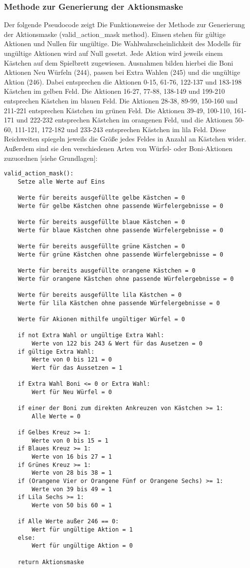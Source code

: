 \subsubsection{Methode zur Generierung der Aktionsmaske}
Der folgende Pseudocode zeigt Die Funktionsweise der Methode zur Generierung der Aktionsmaske (valid\_action\_mask method). Einsen stehen für gültige Aktionen und Nullen für ungültige. Die Wahlwahrscheinlichkeit des Modells für ungültige Aktionen wird auf Null gesetzt. Jede Aktion wird jeweils einem Kästchen auf dem Spielbrett zugewiesen. Ausnahmen bilden hierbei die Boni Aktionen Neu Würfeln (244), passen bei Extra Wahlen (245) und die ungültige Aktion (246). Dabei entsprechen die Aktionen 0-15, 61-76, 122-137 und 183-198 Kästchen im gelben Feld. Die Aktionen 16-27, 77-88, 138-149 und 199-210 entsprechen Kästchen im blauen Feld. Die Aktionen 28-38, 89-99, 150-160 und 211-221 entsprechen Kästchen im grünen Feld. Die Aktionen 39-49, 100-110, 161-171 und 222-232 entsprechen Kästchen im orangenen Feld, und die Aktionen 50-60, 111-121, 172-182 und 233-243 entsprechen Kästchen im lila Feld. Diese Reichweiten spiegeln jeweils die Größe jedes Feldes in Anzahl an Kästchen wider. Außerdem sind sie den verschiedenen Arten von Würfel- oder Boni-Aktionen zuzuordnen [siehe Grundlagen]:
\vspace{0.5cm}
\begin{lstlisting}
valid_action_mask():
	Setze alle Werte auf Eins
	
	Werte für bereits ausgefüllte gelbe Kästchen = 0
	Werte für gelbe Kästchen ohne passende Würfelergebnisse = 0
	
	Werte für bereits ausgefüllte blaue Kästchen = 0
	Werte für blaue Kästchen ohne passende Würfelergebnisse = 0
	
	Werte für bereits ausgefüllte grüne Kästchen = 0
	Werte für grüne Kästchen ohne passende Würfelergebnisse = 0
	
	Werte für bereits ausgefüllte orangene Kästchen = 0
	Werte für orangene Kästchen ohne passende Würfelergebnisse = 0
	
	Werte für bereits ausgefüllte lila Kästchen = 0
	Werte für lila Kästchen ohne passende Würfelergebnisse = 0
	
	Werte für Akionen mithilfe ungültiger Würfel = 0
	
	if not Extra Wahl or ungültige Extra Wahl:
		Werte von 122 bis 243 & Wert für das Ausetzen = 0
	if gültige Extra Wahl:
		Werte von 0 bis 121 = 0
		Wert für das Aussetzen = 1
	
	if Extra Wahl Boni <= 0 or Extra Wahl:
		Wert für Neu Würfel = 0
	
	if einer der Boni zum direkten Ankreuzen von Kästchen >= 1:
		Alle Werte = 0
	
	if Gelbes Kreuz >= 1:
		Werte von 0 bis 15 = 1
	if Blaues Kreuz >= 1:
		Werte von 16 bis 27 = 1
	if Grünes Kreuz >= 1:
		Werte von 28 bis 38 = 1
	if (Orangene Vier or Orangene Fünf or Orangene Sechs) >= 1:
		Werte von 39 bis 49 = 1
	if Lila Sechs >= 1:
		Werte von 50 bis 60 = 1
	
	if Alle Werte außer 246 == 0:
		Wert für ungültige Aktion = 1
	else:
		Wert für ungültige Aktion = 0
		
	return Aktionsmaske
\end{lstlisting}

